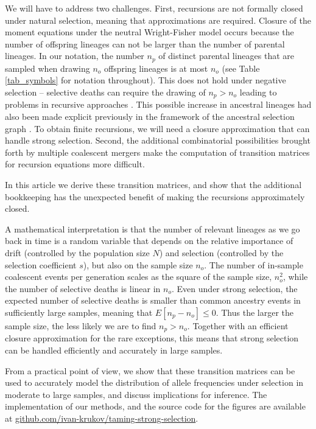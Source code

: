 \documentclass[9pt,twocolumn,twoside,lineno]{gsajnl}
\begin{document}
We will have to address two challenges. First, recursions are not formally closed under natural selection, meaning that
approximations are required.  Closure of the moment equations under the neutral
Wright-Fisher model occurs because the number of offspring lineages can not be larger
than the number of parental lineages. In our notation, the number $n_p$ of distinct
parental lineages that are sampled when drawing $n_o$ offspring lineages is at most
$n_o$ (see Table \ref{tab_symbols} for notation throughout). This does not hold under negative selection --
selective deaths can require the drawing of $n_p>n_o$ leading to problems in recursive approaches \citep{DonnellyKurtz1999a,
JouganousEtAl2017}. This possible increase in ancestral lineages had also been made explicit previously in the framework of the ancestral selection graph
\citep{KroneNeuhauser1997}. To obtain finite recursions, we will need a closure
approximation that can handle strong selection.
Second, the additional combinatorial possibilities brought forth by multiple coalescent
mergers make the computation of transition matrices for recursion equations more
difficult. %

In this article we derive these transition matrices, and show that the
additional bookkeeping has the unexpected benefit of making the recursions approximately closed. 

A mathematical interpretation is that the number of relevant lineages as we go back 
in time is a random variable that depends on the relative importance of drift (controlled by 
the population size $N$) and selection (controlled by the selection coefficient $s$), 
but also on the sample size $n_o$.  The number of in-sample
coalescent events per generation scales as the square of the sample size, $n_o^2$, while the number of
selective deaths is linear in $n_o$. Even under strong selection, the expected number of
selective deaths is smaller than common ancestry events in sufficiently large samples, meaning that 
$E[n_p- n_o]\leq 0.$ Thus the larger the sample size, the less likely we are to find $n_p>n_o.$
Together with an efficient closure approximation for the rare exceptions, this means that strong 
selection can be handled efficiently and accurately in large samples. 


From a practical point of view, we show that these transition matrices can 
be used to accurately model the distribution of allele frequencies under 
selection in moderate to large samples, and discuss implications for inference.
The implementation of our methods,
and the source code for the figures are available at
\url{github.com/ivan-krukov/taming-strong-selection}.
\end{document}
